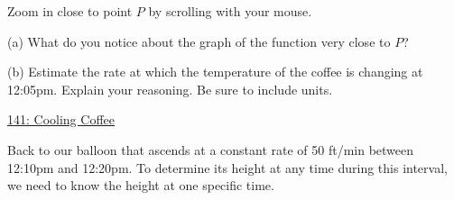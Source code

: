 \documentclass{ximera}
\begin{document}
\begin{exploration}\label{Exp1:LF}
Zoom in close to point $P$ by scrolling with your mouse. 
\begin{question} \label{Q2:LF}
\begin{freeResponse}
(a) What do you notice about the graph of the function very close to $P$?
\end{freeResponse}
(b) Estimate the rate at which the temperature of the coffee is changing at 12:05pm. Explain your reasoning. Be sure to include units.
\end{question}

 
\begin{onlineOnly}
    \begin{center}
\end{center}
\end{onlineOnly}

\href{https://www.desmos.com/calculator/3bvwxb95es}{141: Cooling Coffee}

\end{exploration}


Back to our balloon that ascends at a constant rate of 50 ft/min between 12:10pm and 12:20pm. To determine its height at any time during this interval, we need to know the height at one specific time. 
\end{document}
